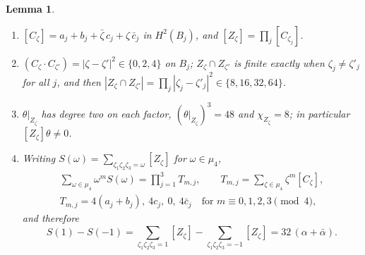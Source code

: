\documentclass[11pt,reqno]{amsart}
\numberwithin{equation}{section}
\theoremstyle{plain}
\newtheorem{lemma}[theorem]{Lemma}
\theoremstyle{definition}
\begin{document}
\begin{lemma}\leavevmode\label{lem:cmcurves}
\begin{enumerate}[label=\textup{(\roman*)},leftmargin=2.4em,itemsep=2pt]
\item $[C_{\zeta}]=a_{j}+b_{j}+\bar\zeta\,c_{j}+\zeta\,\bar c_{j}$ in $H^{2}(B_{j})$, and $[Z_{\zeta}]=\prod_{j}[C_{\zeta_{j}}]$.
\item $(C_{\zeta}\cdot C_{\zeta'})=|\zeta-\zeta'|^{2}\in\{0,2,4\}$ on $B_{j}$; $Z_{\zeta}\cap Z_{\zeta'}$ is finite exactly when $\zeta_{j}\ne\zeta'_{j}$ for all $j$, and then $|Z_{\zeta}\cap Z_{\zeta'}|=\prod_{j}|\zeta_{j}-\zeta'_{j}|^{2}\in\{8,16,32,64\}$.
\item $\theta|_{Z_{\zeta}}$ has degree two on each factor, $(\theta|_{Z_{\zeta}})^{3}=48$ and $\chi_{Z_{\zeta}}=8$; in particular $[Z_{\zeta}]\theta\ne0$.
\item Writing $S(\omega)=\sum_{\zeta_{1}\zeta_{2}\zeta_{3}=\omega}[Z_{\zeta}]$ for $\omega\in\mu_{4}$,
\begin{equation}\label{eq:cmgenerating}
\begin{gathered}
\sum_{\omega\in\mu_{4}}\omega^{m}S(\omega)=\prod_{j=1}^{3}T_{m,j},\qquad T_{m,j}=\sum_{\zeta\in\mu_{4}}\zeta^{m}[C_{\zeta}],\\
T_{m,j}=4(a_{j}+b_{j}),\ 4c_{j},\ 0,\ 4\bar c_{j}\quad\text{for }m\equiv0,1,2,3\pmod 4,
\end{gathered}
\end{equation}
and therefore
\begin{equation}\label{eq:cm32}
S(1)-S(-1)=\sum_{\zeta_{1}\zeta_{2}\zeta_{3}=1}[Z_{\zeta}]-\sum_{\zeta_{1}\zeta_{2}\zeta_{3}=-1}[Z_{\zeta}]=32\,(\alpha+\bar\alpha).
\end{equation}
\end{enumerate}
\end{lemma}
\end{document}
